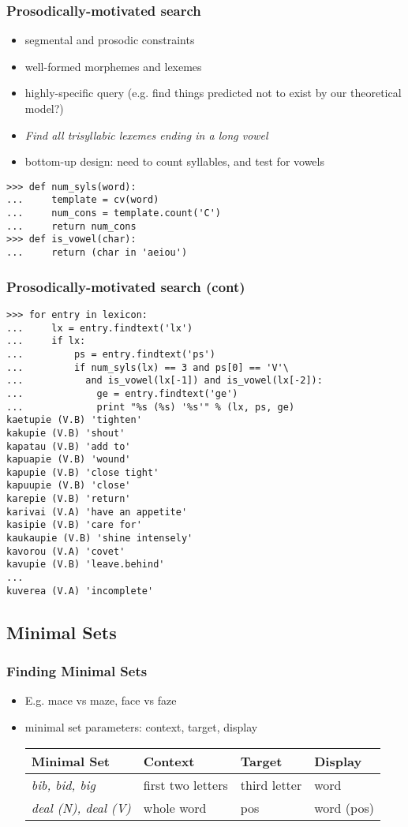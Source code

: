 \documentclass{beamer}             %
\begin{document}
\begin{frame}[fragile]
\frametitle{Prosodically-motivated search}
\small
\begin{itemize}
\item segmental and prosodic constraints
\item well-formed morphemes and lexemes
\item highly-specific query (e.g. find things predicted not to exist
  by our theoretical model?)
\item \textit{Find all trisyllabic lexemes ending in a long vowel}
\item bottom-up design: need to count syllables, and test for vowels
\end{itemize}

\begin{verbatim}
>>> def num_syls(word):
...     template = cv(word)
...     num_cons = template.count('C')
...     return num_cons
>>> def is_vowel(char):
...     return (char in 'aeiou')
\end{verbatim}
\end{frame}

\begin{frame}[fragile]
\frametitle{Prosodically-motivated search (cont)}
\tiny

\begin{verbatim}
>>> for entry in lexicon:
...     lx = entry.findtext('lx')
...     if lx:
...         ps = entry.findtext('ps')
...         if num_syls(lx) == 3 and ps[0] == 'V'\
...           and is_vowel(lx[-1]) and is_vowel(lx[-2]):
...             ge = entry.findtext('ge')
...             print "%s (%s) '%s'" % (lx, ps, ge)
kaetupie (V.B) 'tighten'
kakupie (V.B) 'shout'
kapatau (V.B) 'add to'
kapuapie (V.B) 'wound'
kapupie (V.B) 'close tight'
kapuupie (V.B) 'close'
karepie (V.B) 'return'
karivai (V.A) 'have an appetite'
kasipie (V.B) 'care for'
kaukaupie (V.B) 'shine intensely'
kavorou (V.A) 'covet'
kavupie (V.B) 'leave.behind'
...
kuverea (V.A) 'incomplete'
\end{verbatim}
\end{frame}

\subsection{Minimal Sets}

\begin{frame}
\frametitle{Finding Minimal Sets}
\begin{itemize}
\item E.g. mace vs maze, face vs faze
\item minimal set parameters: context, target, display
\vfil
\small

\begin{tabular}{l|lll}
\textbf{Minimal Set} &     \textbf{Context} &  \textbf{Target} & \textbf{Display} \\ \hline
\textit{bib, bid, big} &   first two letters&  third letter    & word\\
\textit{deal (N), deal (V)} & whole word    &  pos             & word (pos)
\end{tabular}
\end{itemize}
\end{frame}
\end{document}
